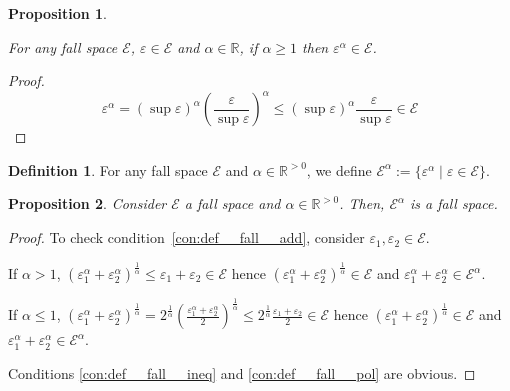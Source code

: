 \documentclass{article}
\numberwithin{equation}{section}
\theoremstyle{definition}
\newtheorem{definition}{Definition}[section]
\theoremstyle{plain}
\newtheorem{proposition}{Proposition}[section]
\newcommand{\Reals}{\mathbb{R}}
\newcommand{\Fall}{\mathcal{E}}
\begin{document}

\begin{proposition}
\label{prp:fall_space_closed_wrt_power}

For any fall space $\Fall$, $\varepsilon \in \Fall$ and $\alpha \in \Reals$, if $\alpha \geq 1$ then $\varepsilon^\alpha \in \Fall$.

\end{proposition}

\begin{proof}

$$\varepsilon^\alpha = (\sup \varepsilon)^\alpha (\frac{\varepsilon}{\sup \varepsilon})^\alpha \leq  (\sup \varepsilon)^\alpha \frac{\varepsilon}{\sup \varepsilon} \in \Fall$$
\end{proof}

\begin{samepage}
\begin{definition}

For any fall space $\Fall$ and $\alpha \in \Reals^{>0}$, we define ${\Fall^\alpha := \{\varepsilon^\alpha \mid \varepsilon \in \Fall\}}$.

\end{definition}
\end{samepage}

\begin{proposition}

Consider $\Fall$ a fall space and $\alpha \in \Reals^{>0}$. Then, $\Fall^\alpha$ is a fall space.

\end{proposition}

\begin{proof}

To check condition~\ref{con:def__fall__add}, consider $\varepsilon_1, \varepsilon_2 \in \Fall$. 

If $\alpha > 1$, $(\varepsilon_1^\alpha + \varepsilon_2^\alpha)^\frac{1}{\alpha} \leq \varepsilon_1 + \varepsilon_2 \in \Fall$ hence $(\varepsilon_1^\alpha + \varepsilon_2^\alpha)^\frac{1}{\alpha} \in \Fall$ and $\varepsilon_1^\alpha + \varepsilon_2^\alpha \in \Fall^\alpha$.

If $\alpha \leq 1$, $(\varepsilon_1^\alpha + \varepsilon_2^\alpha)^\frac{1}{\alpha} = 2^\frac{1}{\alpha}(\frac{\varepsilon_1^\alpha + \varepsilon_2^\alpha}{2})^\frac{1}{\alpha} \leq 2^\frac{1}{\alpha} \frac{\varepsilon_1+\varepsilon_2}{2} \in \Fall$ hence $(\varepsilon_1^\alpha + \varepsilon_2^\alpha)^\frac{1}{\alpha} \in \Fall$ and $\varepsilon_1^\alpha + \varepsilon_2^\alpha \in \Fall^\alpha$.

Conditions \ref{con:def__fall__ineq} and \ref{con:def__fall__pol} are obvious.
\end{proof}
\end{document}
